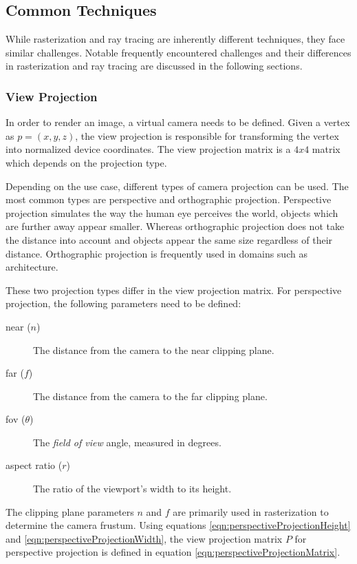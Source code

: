 \subsection{Common Techniques}

While rasterization and ray tracing are inherently different techniques, they face similar challenges. Notable frequently encountered challenges and their differences in rasterization and ray tracing are discussed in the following sections.

\subsubsection{View Projection}
\label{sec:viewProjection}

In order to render an image, a virtual camera needs to be defined. Given a vertex as $p = (x, y, z)$, the view projection is responsible for transforming the vertex into normalized device coordinates. The view projection matrix is a $4x4$ matrix which depends on the projection type.

Depending on the use case, different types of camera projection can be used. The most common types are perspective and orthographic projection. Perspective projection simulates the way the human eye perceives the world, objects which are further away appear smaller. Whereas orthographic projection does not take the distance into account and objects appear the same size regardless of their distance. Orthographic projection is frequently used in domains such as architecture.

These two projection types differ in the view projection matrix. For perspective projection, the following parameters need to be defined:

\begin{description}
    \item[near ($n$)] The distance from the camera to the near clipping plane.
    \item[far ($f$)] The distance from the camera to the far clipping plane.
    \item[fov ($\theta$)] The \textit{field of view} angle, measured in degrees.
    \item[aspect ratio ($r$)] The ratio of the viewport's width to its height.
\end{description}

The clipping plane parameters $n$ and $f$ are primarily used in rasterization to determine the camera frustum. Using equations \ref{eqn:perspectiveProjectionHeight} and \ref{eqn:perspectiveProjectionWidth}, the view projection matrix $P$ for perspective projection is defined in equation \ref{eqn:perspectiveProjectionMatrix}.

